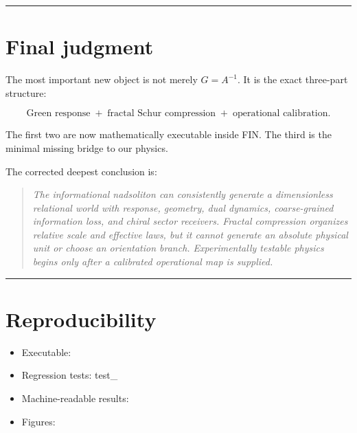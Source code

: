 \documentclass[11pt,a4paper,openany]{report}
\begin{document}
\par\medskip\hrule\medskip

\chapter{Final judgment}

The most important new object is not merely \(G=A^{-1}\). It is the exact three-part structure:

\[
\boxed{
\text{Green response}
\;+\;
\text{fractal Schur compression}
\;+\;
\text{operational calibration}.
}
\]

The first two are now mathematically executable inside FIN. The third is the minimal missing bridge to our physics.

The corrected deepest conclusion is:

\begin{quote}\itshape
The informational nadsoliton can consistently generate a dimensionless relational world with response, geometry, dual dynamics, coarse-grained information loss, and chiral sector receivers. Fractal compression organizes relative scale and effective laws, but it cannot generate an absolute physical unit or choose an orientation branch. Experimentally testable physics begins only after a calibrated operational map is supplied.

\end{quote}

\par\medskip\hrule\medskip

\chapter{Reproducibility}

\begin{itemize}
\item 
Executable: 

\item 
Regression tests: test\_

\item 
Machine-readable results: 

\item 
Figures: 

\end{itemize}
\end{document}
